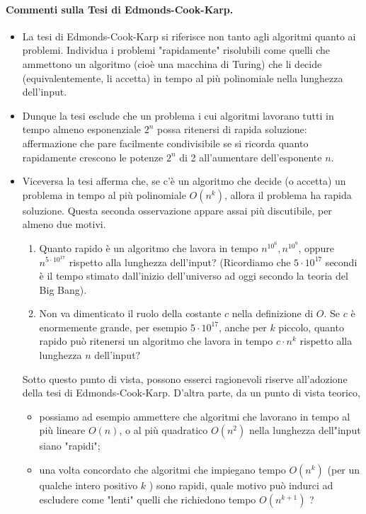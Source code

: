 \paragraph{Commenti sulla Tesi di Edmonds-Cook-Karp.}

\begin{itemize}
    \item La tesi di Edmonds-Cook-Karp si riferisce non tanto agli algoritmi
          quanto ai problemi. Individua i problemi "rapidamente" risolubili come
          quelli che ammettono un algoritmo (cioè una macchina di Turing) che li
          decide (equivalentemente, li accetta) in tempo al più polinomiale nella
          lunghezza dell'input.
    \item Dunque la tesi esclude che un problema i cui algoritmi lavorano tutti in
          tempo almeno esponenziale $2^n$ possa ritenersi di rapida soluzione:
          affermazione che pare facilmente condivisibile se si ricorda quanto rapidamente
          crescono le potenze $2^n$ di 2 all'aumentare dell'esponente $n$.
    \item Viceversa la tesi afferma che, se c'è un algoritmo che decide (o accetta)
          un problema in tempo al più polinomiale $O\left(n^k\right)$, allora il problema
          ha rapida soluzione. Questa seconda osservazione appare assai più discutibile,
          per almeno due motivi.
          \begin{enumerate}
              \item Quanto rapido è un algoritmo che lavora in tempo $n^{10^6}, n^{10^9}$,
                    oppure $n^{5 \cdot 10^{17}}$ rispetto alla lunghezza dell'input? (Ricordiamo
                    che $5 \cdot 10^{17}$ secondi è il tempo stimato dall'inizio dell'universo
                    ad oggi secondo la teoria del Big Bang).
              \item Non va dimenticato il ruolo della costante $c$ nella definizione di $O$.
                    Se $c$ è enormemente grande, per esempio $5 \cdot 10^{17}$, anche per $k$
                    piccolo, quanto rapido può ritenersi un algoritmo che lavora in tempo $c \cdot
                        n^k$ rispetto alla lunghezza $n$ dell'input?
          \end{enumerate}
          Sotto questo punto di vista, possono esserci ragionevoli riserve all'adozione
          della tesi di Edmonds-Cook-Karp. D'altra parte, da un punto di vista teorico,

          \begin{itemize}
              \item possiamo ad esempio ammettere che algoritmi che lavorano in tempo al
                    più lineare $O(n)$, o al più quadratico $O\left(n^2\right)$ nella lunghezza
                    dell"input siano "rapidi";
              \item una volta concordato che algoritmi che impiegano tempo $O\left(n^k\right)$
                    (per un qualche intero positivo $k$ ) sono rapidi, quale motivo può indurci ad
                    escludere come "lenti" quelli che richiedono tempo $O\left(n^{k+1}\right)$ ?
          \end{itemize}
\end{itemize}

